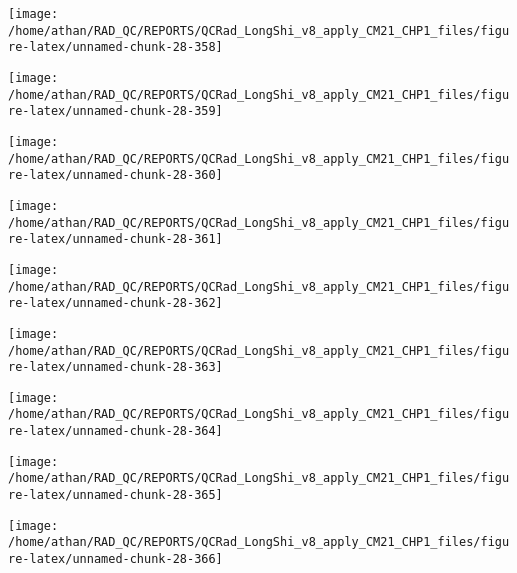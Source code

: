\documentclass[
  10pt,
  a4paper,oneside]{article}
\begin{document}
\begin{center}\texttt{[image: /home/athan/RAD\_QC/REPORTS/QCRad\_LongShi\_v8\_apply\_CM21\_CHP1\_files/figure-latex/unnamed-chunk-28-358]} \end{center}

\begin{center}\texttt{[image: /home/athan/RAD\_QC/REPORTS/QCRad\_LongShi\_v8\_apply\_CM21\_CHP1\_files/figure-latex/unnamed-chunk-28-359]} \end{center}

\begin{center}\texttt{[image: /home/athan/RAD\_QC/REPORTS/QCRad\_LongShi\_v8\_apply\_CM21\_CHP1\_files/figure-latex/unnamed-chunk-28-360]} \end{center}

\begin{center}\texttt{[image: /home/athan/RAD\_QC/REPORTS/QCRad\_LongShi\_v8\_apply\_CM21\_CHP1\_files/figure-latex/unnamed-chunk-28-361]} \end{center}

\begin{center}\texttt{[image: /home/athan/RAD\_QC/REPORTS/QCRad\_LongShi\_v8\_apply\_CM21\_CHP1\_files/figure-latex/unnamed-chunk-28-362]} \end{center}

\begin{center}\texttt{[image: /home/athan/RAD\_QC/REPORTS/QCRad\_LongShi\_v8\_apply\_CM21\_CHP1\_files/figure-latex/unnamed-chunk-28-363]} \end{center}

\begin{center}\texttt{[image: /home/athan/RAD\_QC/REPORTS/QCRad\_LongShi\_v8\_apply\_CM21\_CHP1\_files/figure-latex/unnamed-chunk-28-364]} \end{center}

\begin{center}\texttt{[image: /home/athan/RAD\_QC/REPORTS/QCRad\_LongShi\_v8\_apply\_CM21\_CHP1\_files/figure-latex/unnamed-chunk-28-365]} \end{center}

\begin{center}\texttt{[image: /home/athan/RAD\_QC/REPORTS/QCRad\_LongShi\_v8\_apply\_CM21\_CHP1\_files/figure-latex/unnamed-chunk-28-366]} \end{center}
\end{document}
